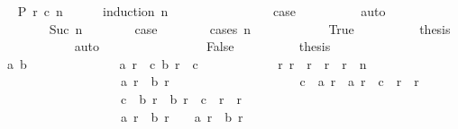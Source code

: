 \begin{isabellebody}
\ \isamarkupfalse%
\ {\isachardoublequoteopen}{\isacharquery}P\ r{}\ c{}\ n{\isachardoublequoteclose}\isanewline
\ \ \ \ \isamarkupfalse%
\ {\isacharparenleft}induction\ n{\isacharparenright}\isanewline
\ \ \ \ \ \ \isamarkupfalse%
\ {}\isanewline
\ \ \ \ \ \ \isamarkupfalse%
\ {\isacharquery}case\isanewline
\ \ \ \ \ \ \ \ \isamarkupfalse%
\ auto\isanewline
\ \ \ \ \isamarkupfalse%
\isanewline
\ \ \ \ \ \ \isamarkupfalse%
\ {\isacharparenleft}Suc\ n{\isacharparenright}\isanewline
\isanewline
\ \ \ \ \ \ \isamarkupfalse%
\ {\isacharquery}case\isanewline
\ \ \ \ \ \ \isamarkupfalse%
\ {\isacharparenleft}cases\ {\isachardoublequoteopen}n\ {\isacharequal}\ {}{\isachardoublequoteclose}{\isacharparenright}\isanewline
\ \ \ \ \ \ \ \ \isamarkupfalse%
\ True\isanewline
\ \ \ \ \ \ \ \ \isamarkupfalse%
\ {\isacharquery}thesis\isanewline
\ \ \ \ \ \ \ \ \ \ \isamarkupfalse%
\ auto\isanewline
\ \ \ \ \ \ \isamarkupfalse%
\isanewline
\ \ \ \ \ \ \ \ \isamarkupfalse%
\ False\isanewline
\ \ \ \ \ \ \ \ \isamarkupfalse%
\ {\isacharquery}thesis\isanewline
\ \ \ \ \ \ \ \ \isamarkupfalse%
{\isacharminus}\isanewline
\ \ \ \ \ \ \ \ \ \ \isamarkupfalse%
\ a\ b\ \ {\isacharasterisk}{\isacharcolon}\isanewline
\ \ \ \ \ \ \ \ \ \ \ \ {\isachardoublequoteopen}a\ r{}\ {\isacharequal}\ c{}{\isachardoublequoteclose}\ {\isachardoublequoteopen}b\ r{}\ {\isacharequal}\ c{}{\isachardoublequoteclose}\isanewline
\ \ \ \ \ \ \ \ \ \ \ \ {\isachardoublequoteopen}{\isasymforall}r{\isachardot}\ r{}\ {\isacharless}\ r\ {\isasymand}\ r\ {\isacharless}\ r{}\ {\isacharplus}\ n\ {\isasymlongrightarrow}\isanewline
\ \ \ \ \ \ \ \ \ \ \ \ \ \ \ \ \ \ \ a\ r\ {\isasymnoteq}\ b\ r\ {\isasymand}\isanewline
\ \ \ \ \ \ \ \ \ \ \ \ \ \ \ \ \ \ \ c{}\ {\isasymle}\ a\ r\ {\isasymand}\ a\ r\ {\isasymle}\ c{}\ {\isacharplus}\ {\isacharparenleft}r\ {\isacharminus}\ r{}{\isacharparenright}\ {\isasymand}\isanewline
\ \ \ \ \ \ \ \ \ \ \ \ \ \ \ \ \ \ \ c{}\ {\isasymle}\ b\ r\ {\isasymand}\ b\ r\ {\isasymle}\ c{}\ {\isacharplus}\ {\isacharparenleft}r\ {\isacharminus}\ r{}{\isacharparenright}\ {\isasymand}\isanewline
\ \ \ \ \ \ \ \ \ \ \ \ \ \ \ \ \ \ \ {\isacharparenleft}a\ r\ {\isacharequal}\ b\ {\isacharparenleft}r\ {\isacharminus}\ {}{\isacharparenright}\ {\isasymor}\ a\ r\ {\isacharequal}\ b\ {\isacharparenleft}r\ {\isacharminus}\ {}{\isacharparenright}\ {\isacharplus}\ {}{\isacharparenright}\ {\isasymand}\isanewline

\end{isabellebody}
